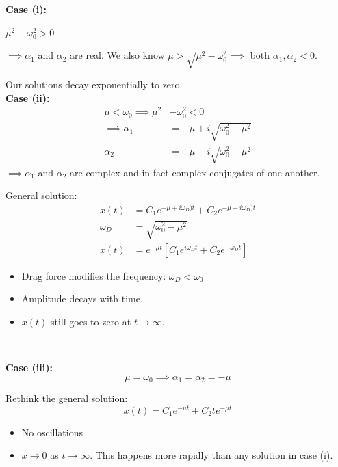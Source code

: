 \documentclass[10pt]{scrartcl}
\begin{document}
\textbf{Case (i):}

$\mu^2 - \omega_0^2 > 0$

$\implies \alpha_1$ and $\alpha_2$ are real. We also know $\mu > \sqrt{\mu^2 - \omega_0^2} \implies$ both $\alpha_1,\alpha_2 < 0$. 

Our solutions decay exponentially to zero.\\

\textbf{Case (ii):}
\[
\begin{aligned}
\mu < \omega_0
  \implies \mu^2 &- \omega_0^2 < 0\\
  \implies \alpha_1 &= -\mu + i\sqrt{\omega_0^2 -\mu^2}\\
  \alpha_2 &= -\mu -i\sqrt{\omega_0^2 - \mu^2}
\end{aligned}
\]
$\implies \alpha_1$ and $\alpha_2$ are complex and in fact complex conjugates of one another. 

General solution:
\[
\begin{aligned}
  x(t) &= C_1e^{-\mu + i\omega_D)t} + C_2e^{-\mu-i\omega_D)t}\\
  \omega_D &= \sqrt{\omega_0^2 - \mu^2}\\
  x(t) &= e^{-\mu t}[C_1e^{i\omega_Dt} + C_2e^{-\omega_Dt}]
\end{aligned}
\]

\begin{itemize}
  \item Drag force modifies the frequency: $\omega_D < \omega_0$
  \item Amplitude decays with time. 
  \item $x(t)$ still goes to zero at $t \to \infty$.
\end{itemize}~


\textbf{Case (iii):}
\[\mu = \omega_0 \implies \alpha_1 = \alpha_2 = -\mu\]

Rethink the general solution:
\[x(t) = C_1e^{-\mu t} + C_2te^{-\mu t}\]

\begin{itemize}
  \item No oscillations
  \item $x \to 0$ as $t \to \infty$. This happens more rapidly than any solution in case (i). 
\end{itemize}~
\end{document}
